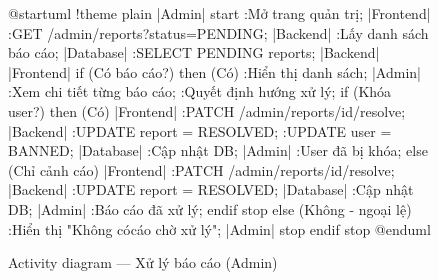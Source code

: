 \documentclass[12pt,a4paper]{report}
\begin{document}
\renewcommand{\arraystretch}{1}

\begin{figure}[H]
    \centering
    \begin{plantuml}
        @startuml
        !theme plain
        |Admin|
        start
        :Mở trang quản trị;
        |Frontend|
        :GET /admin/reports?status=PENDING;
        |Backend|
        :Lấy danh sách báo cáo;
        |Database|
        :SELECT PENDING reports;
        |Backend|
        |Frontend|
        if (Có báo cáo?) then (Có)
          :Hiển thị danh sách;
          |Admin|
          :Xem chi tiết từng báo cáo;
          :Quyết định hướng xử lý;
          if (Khóa user?) then (Có)
            |Frontend|
            :PATCH /admin/reports/{id}/resolve;
            |Backend|
            :UPDATE report = RESOLVED;
            :UPDATE user = BANNED;
            |Database|
            :Cập nhật DB;
            |Admin|
            :User đã bị khóa;
          else (Chỉ cảnh cáo)
            |Frontend|
            :PATCH /admin/reports/{id}/resolve;
            |Backend|
            :UPDATE report = RESOLVED;
            |Database|
            :Cập nhật DB;
            |Admin|
            :Báo cáo đã xử lý;
          endif
          stop
        else (Không - ngoại lệ)
          :Hiển thị "Không có cáo chờ xử lý";
          |Admin|
          stop
        endif
        stop
        @enduml
    \end{plantuml}
    \caption{Activity diagram --- Xử lý báo cáo (Admin)}
\end{figure}
\end{document}
